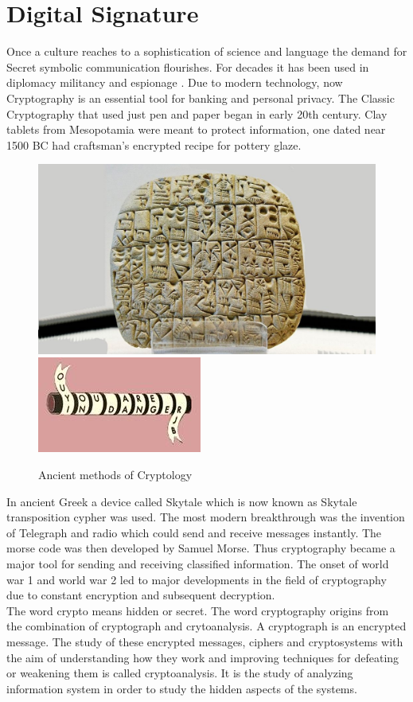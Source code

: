 \documentclass{report}
\begin{document}
\section{Digital Signature}
 Once a culture reaches to a sophistication of  science and language the demand for Secret symbolic communication  flourishes. For decades it has been used in diplomacy militancy and espionage . Due to modern technology, now Cryptography is an essential tool for banking and personal privacy. The Classic Cryptography that used just pen and paper began in early 20th century.  Clay tablets from Mesopotamia were meant to protect information, one dated near 1500 BC had craftsman's encrypted recipe for pottery glaze.\\

     \begin{figure}[!h]
    \centering
     \includegraphics[scale=0.12]{Ancient-clay-tablet-1024x576.jpg}
     \includegraphics[scale=0.76]{3c60b59d-9a9b-453d-9897-8cc601e3d67f_l.jpg}
\caption{Ancient methods of Cryptology}
  \end{figure}
  
   In ancient Greek a device called Skytale which is now known as Skytale transposition cypher was used.  The most modern breakthrough was the invention of Telegraph and radio which could send and receive messages  instantly. The morse code was then developed by Samuel Morse. Thus cryptography became a major tool for sending and receiving classified information. The onset of world war 1 and world war 2 led to major developments in the field of cryptography due to constant encryption and subsequent decryption. \\
The word crypto means hidden or secret. The word cryptography origins from the combination of cryptograph and crytoanalysis. A cryptograph is an encrypted message. The study of these encrypted messages, ciphers and cryptosystems with the aim of understanding how they work and improving techniques for defeating or weakening them is called cryptoanalysis. It is the study of analyzing information system in order to study the hidden aspects of the systems.
\end{document}
